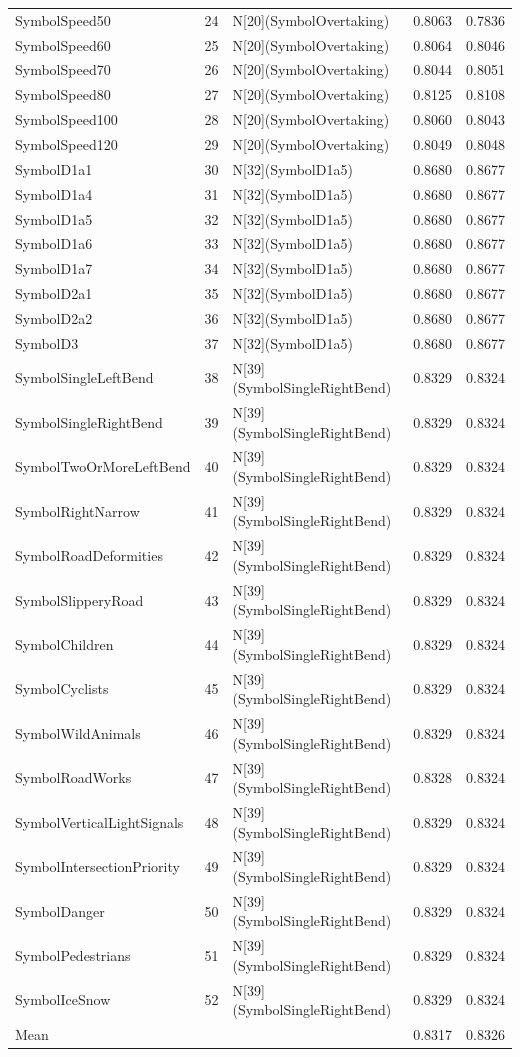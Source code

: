 \begin{tabular}{lllll}
SymbolSpeed50 & 24 & N[20](SymbolOvertaking) & 0.8063 & 0.7836 \\
SymbolSpeed60 & 25 & N[20](SymbolOvertaking) & 0.8064 & 0.8046 \\
SymbolSpeed70 & 26 & N[20](SymbolOvertaking) & 0.8044 & 0.8051 \\
SymbolSpeed80 & 27 & N[20](SymbolOvertaking) & 0.8125 & 0.8108 \\
SymbolSpeed100 & 28 & N[20](SymbolOvertaking) & 0.8060 & 0.8043 \\
SymbolSpeed120 & 29 & N[20](SymbolOvertaking) & 0.8049 & 0.8048 \\
SymbolD1a1 & 30 & N[32](SymbolD1a5) & 0.8680 & 0.8677 \\
SymbolD1a4 & 31 & N[32](SymbolD1a5) & 0.8680 & 0.8677 \\
SymbolD1a5 & 32 & N[32](SymbolD1a5) & 0.8680 & 0.8677 \\
SymbolD1a6 & 33 & N[32](SymbolD1a5) & 0.8680 & 0.8677 \\
SymbolD1a7 & 34 & N[32](SymbolD1a5) & 0.8680 & 0.8677 \\
SymbolD2a1 & 35 & N[32](SymbolD1a5) & 0.8680 & 0.8677 \\
SymbolD2a2 & 36 & N[32](SymbolD1a5) & 0.8680 & 0.8677 \\
SymbolD3 & 37 & N[32](SymbolD1a5) & 0.8680 & 0.8677 \\
SymbolSingleLeftBend & 38 & N[39](SymbolSingleRightBend) & 0.8329 & 0.8324 \\
SymbolSingleRightBend & 39 & N[39](SymbolSingleRightBend) & 0.8329 & 0.8324 \\
SymbolTwoOrMoreLeftBend & 40 & N[39](SymbolSingleRightBend) & 0.8329 & 0.8324 \\
SymbolRightNarrow & 41 & N[39](SymbolSingleRightBend) & 0.8329 & 0.8324 \\
SymbolRoadDeformities & 42 & N[39](SymbolSingleRightBend) & 0.8329 & 0.8324 \\
SymbolSlipperyRoad & 43 & N[39](SymbolSingleRightBend) & 0.8329 & 0.8324 \\
SymbolChildren & 44 & N[39](SymbolSingleRightBend) & 0.8329 & 0.8324 \\
SymbolCyclists & 45 & N[39](SymbolSingleRightBend) & 0.8329 & 0.8324 \\
SymbolWildAnimals & 46 & N[39](SymbolSingleRightBend) & 0.8329 & 0.8324 \\
SymbolRoadWorks & 47 & N[39](SymbolSingleRightBend) & 0.8328 & 0.8324 \\
SymbolVerticalLightSignals & 48 & N[39](SymbolSingleRightBend) & 0.8329 & 0.8324 \\
SymbolIntersectionPriority & 49 & N[39](SymbolSingleRightBend) & 0.8329 & 0.8324 \\
SymbolDanger & 50 & N[39](SymbolSingleRightBend) & 0.8329 & 0.8324 \\
SymbolPedestrians & 51 & N[39](SymbolSingleRightBend) & 0.8329 & 0.8324 \\
SymbolIceSnow & 52 & N[39](SymbolSingleRightBend) & 0.8329 & 0.8324 \\
Mean &  &  & 0.8317 & 0.8326 \\
\bottomrule
\end{tabular}
